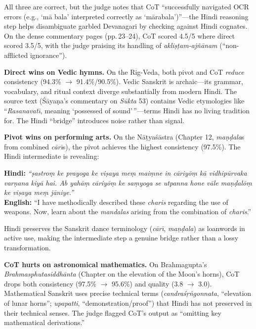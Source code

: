 \documentclass[10pt,twocolumn]{article}
\begin{document}
\noindent All three are correct, but the judge notes that CoT ``successfully navigated OCR errors (e.g., `m\=a bala' interpreted correctly as `m\=arabala')''---the Hindi reasoning step helps disambiguate garbled Devanagari by checking against Hindi cognates. On the dense commentary pages (pp.\,23--24), CoT scored 4.5/5 where direct scored 3.5/5, with the judge praising its handling of \emph{akli\d{s}\d{t}am-aj\~n\=anam} (``non-afflicted ignorance'').

\textbf{Direct wins on Vedic hymns.} On the Rig-Veda, both pivot and CoT \emph{reduce} consistency (94.3\% $\to$ 91.4\%/90.5\%). Vedic Sanskrit is archaic---its grammar, vocabulary, and ritual context diverge substantially from modern Hindi. The source text (\'S\=aya\d{n}a's commentary on \emph{S\=ukta} 53) contains Vedic etymologies like ``\emph{Rasanavat\={\i}}, meaning `possessed of sound'\,''---terms Hindi has no living tradition for. The Hindi ``bridge'' introduces noise rather than signal.

\textbf{Pivot wins on performing arts.} On the N\=a\d{t}ya\'s\=astra (Chapter 12, \emph{ma\d{n}\d{d}ala}s from combined \emph{c\=ar\={\i}}s), the pivot achieves the highest consistency (97.5\%). The Hindi intermediate is revealing:

{\small
\noindent\textbf{Hindi:} \emph{``\d{s}astro\d{m} ke prayoga ke vi\d{s}aya me\d{m} mai\d{m}ne in c\=ariy\=o\d{m} k\=a vidhip\=urvaka var\d{n}ana kiy\=a hai. Ab yah\=a\d{m} c\=ariy\=o\d{m} ke sa\d{m}yoga se utpanna hone v\=ale ma\d{n}\d{d}al\=o\d{m} ke vi\d{s}aya me\d{m} j\=aniye.''}\\
\textbf{English:} ``I have methodically described these \emph{charis} regarding the use of weapons. Now, learn about the \emph{mandalas} arising from the combination of \emph{charis}.''
}

\noindent Hindi preserves the Sanskrit dance terminology (\emph{c\=ar\={\i}}, \emph{ma\d{n}\d{d}ala}) as loanwords in active use, making the intermediate step a genuine bridge rather than a lossy transformation.

\textbf{CoT hurts on astronomical mathematics.} On Brahmagupta's \emph{Brahmasphutasiddh\=anta} (Chapter on the elevation of the Moon's horns), CoT drops both consistency (97.5\% $\to$ 95.6\%) and quality (3.8 $\to$ 3.0). Mathematical Sanskrit uses precise technical terms (\emph{candra\'s\d{r}\.ngonnata}, ``elevation of lunar horns''; \emph{upapatti}, ``demonstration/proof'') that Hindi has not preserved in their technical senses. The judge flagged CoT's output as ``omitting key mathematical derivations.''
\end{document}
